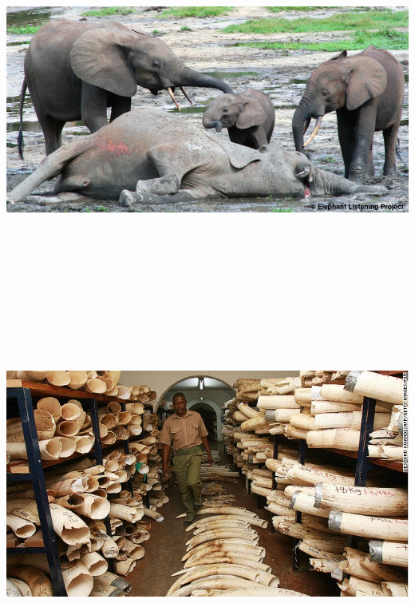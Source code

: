 \begin{frame}{}
\protect\hypertarget{section-26}{}

\includegraphics[width=\textwidth,height=4.6875in]{figures/m4_elephant.png}

\end{frame}

\begin{frame}{}
\protect\hypertarget{section-27}{}

\includegraphics[width=\textwidth,height=4.6875in]{figures/m4_ivory.jpg}

\end{frame}

